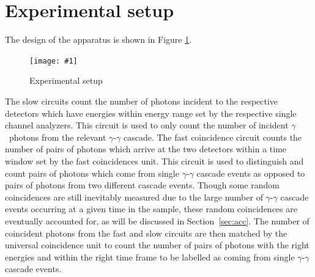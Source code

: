 \documentclass[twocolumn]{article}
\newcommand{\insertFigure}[1]{%
   \texttt{[image: \#1]}%
}
\begin{document}
\section{Experimental setup}
The design of the apparatus is shown in Figure \ref{fig:exp_setup}. 
\begin{figure}[!h]
	\centering
	\insertFigure{k223_setup.png}
	\caption{Experimental setup \cite{booklet}}
	\label{fig:exp_setup}
\end{figure}
The slow circuits count the number of photons incident to the respective detectors which have energies within energy range set by the respective single channel analyzers. This circuit is used to only count the number of incident $\gamma$~photons from the relevant $\gamma$-$\gamma$ cascade. The fast coincidence circuit counts the number of pairs of photons which arrive at the two detectors within a time window set by the fast coincidences unit. This circuit is used to distinguish and count pairs of photons which come from single $\gamma$-$\gamma$ cascade events as opposed to pairs of photons from two different cascade events. Though some random coincidences are still inevitably measured due to the large number of $\gamma$-$\gamma$ cascade events occurring at a given time in the sample, these random coincidences are eventually accounted for, as will be discussed in Section~\ref{sec:acc}. The number of coincident photons from the fast and slow circuits are then matched by the universal coincidence unit to count the number of pairs of photons with the right energies and within the right time frame to be labelled as coming from single $\gamma$-$\gamma$ cascade events.
\end{document}
